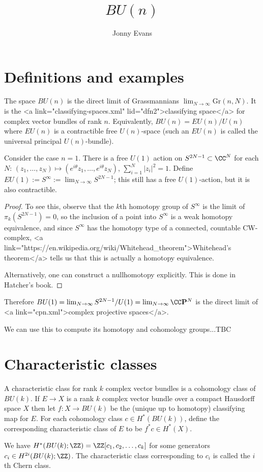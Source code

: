 \documentclass{amsart}
\title{$BU(n)$}
\author{Jonny Evans}
\begin{document}
\section{Definitions and examples}

The space $BU(n)$ is the direct limit of Grassmannians $\lim_{N\to\infty}\mathrm{Gr}(n,N)$. It is the <a link="classifying-spaces.xml" lid="dfn2">classifying space</a> for complex vector bundles of rank $n$. Equivalently, $BU(n)=EU(n)/U(n)$ where $EU(n)$ is a contractible free $U(n)$-space (such an $EU(n)$ is called the universal principal $U(n)$-bundle).

\begin{Example}[exm1]
  Consider the case $n=1$. There is a free $U(1)$ action on $S^{2N-1}\subset\CC^N$ for each $N$: $(z_1,\ldots,z_N)\mapsto(e^{i\theta}z_1,\ldots,e^{i\theta}z_N)$, $\sum_{i=1}^N|z_i|^2=1$. Define $EU(1):=S^{\infty}:=\lim_{N\to\infty}S^{2N-1}$; this still has a free $U(1)$-action, but it is also contractible.
\end{Example}
\begin{proof}
  To see this, observe that the $k$th homotopy group of $S^{\infty}$ is the limit of $\pi_k(S^{2N-1})=0$, so the inclusion of a point into $S^{\infty}$ is a weak homotopy equivalence, and since $S^{\infty}$ has the homotopy type of a connected, countable CW-complex, <a link="https://en.wikipedia.org/wiki/Whitehead_theorem">Whitehead's theorem</a> tells us that this is actually a homotopy equivalence.

  Alternatively, one can construct a nullhomotopy explicitly. This is done in Hatcher's book.
\end{proof}

Therefore $BU(1)=\lim_{N\to\infty}S^{2N-1}/U(1)=\lim_{N\to\infty}\CC\mathbf{P}^N$ is the direct limit of <a link="cpn.xml">complex projective spaces</a>.

We can use this to compute its homotopy and cohomology groups...TBC

\section{Characteristic classes}

\begin{Definition}
  A characteristic class for rank $k$ complex vector bundles is a cohomology class of $BU(k)$. If $E\to X$ is a rank $k$ complex vector bundle over a compact Hausdorff space $X$ then let $f\colon X\to BU(k)$ be the (unique up to homotopy) classifying map for $E$. For each cohomology class $c\in H^*(BU(k))$, define the corresponding characteristic class of $E$ to be $f^*c\in H^*(X)$.
\end{Definition}

\begin{Example}
  We have $H^*(BU(k);\ZZ)=\ZZ[c_1,c_2,\ldots,c_k]$ for some generators $c_i\in H^{2i}(BU(k);\ZZ)$. The characteristic class corresponding to $c_i$ is called the $i$th Chern class.
\end{Example}
\end{document}
